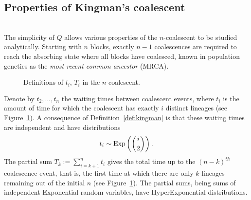 \subsection{Properties of Kingman's coalescent}\label{sec:KCproperties}
\\
The simplicity of $Q$ allows various properties of the $n$-coalescent to be studied analytically.
Starting with $n$ blocks, exactly $n-1$ coalescences are required to reach the absorbing state where all blocks have coalesced, known in population genetics as the \emph{most recent common ancestor} (MRCA).

\begin{figure}[ht]
\centering
{}
\caption{Definitions of $t_i$, $T_i$ in the $n$-coalescent.}
\label{fig:KC_timedefns}
\end{figure}

Denote by $t_2, \dots, t_n$ the waiting times between coalescent events, where $t_i$ is the amount of time for which the coalescent has exactly $i$ distinct lineages (see Figure~\ref{fig:KC_timedefns}).
A consequence of Definition~\ref{def:kingman} is that these waiting times are independent and have distributions
\begin{equation*}
t_i \sim \operatorname{Exp}\left( \binom{i}{2} \right) .
\end{equation*}
The partial sum $T_k := \sum_{i=k+1}^n t_i$ gives the total time up to the $(n-k)^{th}$ coalescence event, that is, the first time at which there are only $k$ lineages remaining out of the initial $n$ (see Figure~\ref{fig:KC_timedefns}).
The partial sums, being sums of independent Exponential random variables, have HyperExponential distributions.

